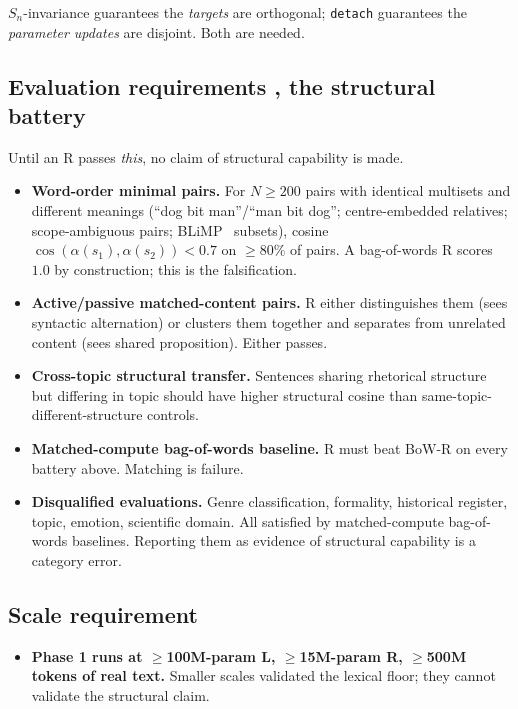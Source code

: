 \documentclass[10pt, twocolumn, a4paper]{article}
\newenvironment{checklist}{\begin{itemize}[leftmargin=2em,labelsep=0.5em,itemsep=2pt]\renewcommand{\labelitemi}{$\square$}}{\end{itemize}}
\begin{document}
$S_n$-invariance guarantees the \emph{targets} are orthogonal; \texttt{detach} guarantees the \emph{parameter updates} are disjoint. Both are needed.

\subsection*{Evaluation requirements ,  the structural battery}

Until an R passes \emph{this}, no claim of structural capability is made.

\begin{checklist}
\item \textbf{Word-order minimal pairs.} For $N \geq 200$ pairs with identical multisets and different meanings (``dog bit man''/``man bit dog''; centre-embedded relatives; scope-ambiguous pairs; BLiMP~\cite{blimp} subsets), cosine $\cos(\alpha(s_1), \alpha(s_2)) < 0.7$ on $\geq 80\%$ of pairs. A bag-of-words R scores $1.0$ by construction; this is the falsification.
\item \textbf{Active/passive matched-content pairs.} R either distinguishes them (sees syntactic alternation) or clusters them together and separates from unrelated content (sees shared proposition). Either passes.
\item \textbf{Cross-topic structural transfer.} Sentences sharing rhetorical structure but differing in topic should have higher structural cosine than same-topic-different-structure controls.
\item \textbf{Matched-compute bag-of-words baseline.} R must beat BoW-R on every battery above. Matching is failure.
\item \textbf{Disqualified evaluations.} Genre classification, formality, historical register, topic, emotion, scientific domain. All satisfied by matched-compute bag-of-words baselines. Reporting them as evidence of structural capability is a category error.
\end{checklist}

\subsection*{Scale requirement}

\begin{checklist}
\item \textbf{Phase 1 runs at $\geq$100M-param L, $\geq$15M-param R, $\geq$500M tokens of real text.} Smaller scales validated the lexical floor; they cannot validate the structural claim.
\end{checklist}
\end{document}
